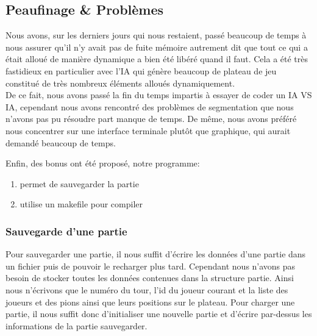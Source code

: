 \documentclass{article}
\begin{document}
    \subsection{Peaufinage \& Problèmes}
        Nous avons, sur les derniers jours qui nous restaient, passé beaucoup de temps à nous assurer qu'il n'y avait pas de fuite mémoire autrement dit que tout ce qui a était alloué de manière dynamique a bien été libéré quand il faut. Cela a été très fastidieux en particulier avec l'IA qui génère beaucoup de plateau de jeu constitué de très nombreux éléments alloués dynamiquement. \\
        De ce fait, nous avons passé la fin du temps impartis à essayer de coder un IA VS IA, cependant nous avons rencontré des problèmes de segmentation que nous n'avons pas pu résoudre part manque de temps. De même, nous avons préféré nous concentrer sur une interface terminale plutôt que graphique, qui aurait demandé beaucoup de temps. 

        Enfin, des bonus ont été proposé, notre programme:
            \begin{enumerate}
                \item permet de sauvegarder la partie
                \item utilise un makefile pour compiler
            \end{enumerate}

    \subsubsection{Sauvegarde d'une partie}
        Pour sauvegarder une partie, il nous suffit d'écrire les données d'une partie dans un fichier puis de pouvoir le recharger plus tard. Cependant nous n'avons pas besoin de stocker toutes les données contenues dans la structure partie. Ainsi nous n'écrivons que le numéro du tour, l'id du joueur courant et la liste des joueurs et des pions ainsi que leurs positions sur le plateau.
        Pour charger une partie, il nous suffit donc d'initialiser une nouvelle partie et d'écrire par-dessus les informations de la partie sauvegarder.

\pagebreak
\end{document}
